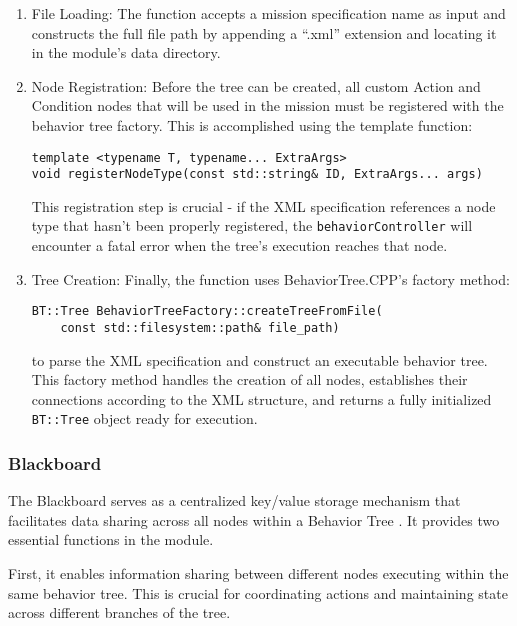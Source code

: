 \documentclass{CSSRforAfrica}
\begin{document}
\begin{enumerate}
    \item \textnormal{File Loading:} The function accepts a mission specification name as input and constructs the full file path by appending a ``.xml'' extension and locating it in the module's data directory. 

    \item \textnormal{Node Registration:} Before the tree can be created, all custom Action and Condition nodes that will be used in the mission must be registered with the behavior tree factory. This is accomplished using the template function:
    \begin{lstlisting}[style=cppstyle]
template <typename T, typename... ExtraArgs>
void registerNodeType(const std::string& ID, ExtraArgs... args)
    \end{lstlisting}
    This registration step is crucial - if the XML specification references a node type that hasn't been properly registered, the \texttt{\small behaviorController} will encounter a fatal error when the tree's execution reaches that node.

    \item \textnormal{Tree Creation:} Finally, the function uses BehaviorTree.CPP's factory method:
    \begin{lstlisting}[style=cppstyle]
BT::Tree BehaviorTreeFactory::createTreeFromFile(
    const std::filesystem::path& file_path)
    \end{lstlisting}
    to parse the XML specification and construct an executable behavior tree. This factory method handles the creation of all nodes, establishes their connections according to the XML structure, and returns a fully initialized \texttt{\small BT::Tree} object ready for execution.
\end{enumerate}

\subsubsection{Blackboard}

The Blackboard serves as a centralized key/value storage mechanism that facilitates data sharing across all nodes within a Behavior Tree \cite{BehaviorTreeWebsite}. It provides two essential functions in the module. 

First, it enables information sharing between different nodes executing within the same behavior tree. This is crucial for coordinating actions and maintaining state across different branches of the tree.
\end{document}
